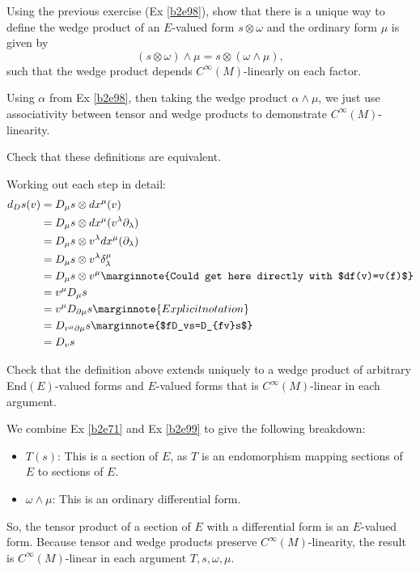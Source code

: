\documentclass[10pt]{article}
\begin{document}
\begin{example}\label{b2e99}
	Using the previous exercise (Ex \ref{b2e98}), show that there is a unique way to define the wedge product of an $E$-valued form $s\otimes \omega$ and the ordinary form $\mu$ is given by
	$$
	(s\otimes \omega) \wedge \mu = s\otimes (\omega \wedge \mu),
	$$
	such that the wedge product depends $C^\infty(M)$-linearly on each factor.
\end{example}
\sol Using $\alpha$ from Ex \ref{b2e98}, then taking the wedge product $\alpha \wedge \mu$, we just use associativity between tensor and wedge products to demonstrate $C^\infty(M)$-linearity.


\begin{example}
	Check that these definitions are equivalent.
\end{example}
\sol Working out each step in detail:
$$
\begin{aligned}
	d_Ds(v) &= D_\mu s \otimes dx^\mu(v)\\
	&= D_\mu s \otimes dx^\mu(v^\lambda \partial_\lambda)\\
	&= D_\mu s \otimes v^\lambda dx^\mu(\partial_\lambda)\\
	&= D_\mu s \otimes v^\lambda \delta^\mu_\lambda\\
	&= D_\mu s \otimes v^\mu \marginnote{Could get here directly with $df(v)=v(f)$}\\
	&= v^\mu D_\mu s \\
	&= v^\mu D_{\partial\mu} s \marginnote{Explicit notation}\\
	&= D_{v^\mu \partial\mu} s \marginnote{$fD_vs=D_{fv}s$}\\
	&= D_v s \\
\end{aligned}
$$


\begin{example}\label{b2e101}
	Check that the definition above extends uniquely to a wedge product of arbitrary End$(E)$-valued forms and $E$-valued forms that is $C^\infty(M)$-linear in each argument.
\end{example}
\sol We combine Ex \ref{b2e71} and Ex \ref{b2e99} to give the following breakdown:
\begin{itemize}
	\item $T(s)$: This is a section of $E$, as $T$ is an endomorphism mapping sections of $E$ to sections of $E$.
	\item $\omega\wedge\mu$: This is an ordinary differential form.
\end{itemize}
So, the tensor product of a section of $E$ with a differential form is an $E$-valued form. Because tensor and wedge products preserve $C^\infty(M)$-linearity, the result is $C^\infty(M)$-linear in each argument $T,s,\omega,\mu$.
\end{document}
